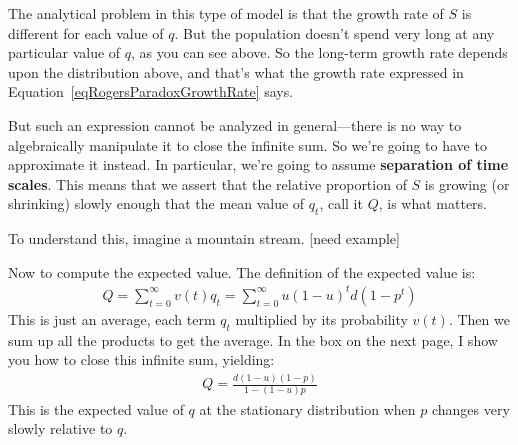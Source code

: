 \documentclass[10pt,reqno]{amsbook}
\newcommand{\bemph}[1]{{\textbf{\textcolor{bemphcol}{#1}}}}
\numberwithin{equation}{chapter}
\begin{document}
The analytical problem in this type of model is that the growth rate of $S$ is different for each value of $q$. But the population doesn't spend very long at any particular value of $q$, as you can see above. So the long-term growth rate depends upon the distribution above, and that's what the growth rate expressed in Equation~\ref{eqRogersParadoxGrowthRate} says. 

But such an expression cannot be analyzed in general---there is no way to algebraically manipulate it to close the infinite sum. So we're going to have to approximate it instead.  
In particular, we're going to assume \bemph{separation of time scales}. This means that we assert that the relative proportion of $S$ is growing (or shrinking) slowly enough that the mean value of $q_t$, call it $Q$, is what matters. 

To understand this, imagine a mountain stream. [need example]

Now to compute the expected value. The definition of the expected value is:
\begin{align*}
	Q = \sum_{t=0}^\infty v(t) q_t = \sum_{t=0}^\infty u(1-u)^t d(1-p^t)
\end{align*}
This is just an average, each term $q_t$ multiplied by its probability $v(t)$. Then we sum up all the products to get the average. In the box on the next page, I show you how to close this infinite sum, yielding:
\begin{align}
	Q = \frac{d(1-u)(1-p)}{1-(1-u)p}
\end{align}
This is the expected value of $q$ at the stationary distribution when $p$ changes very slowly relative to $q$. 
\end{document}
